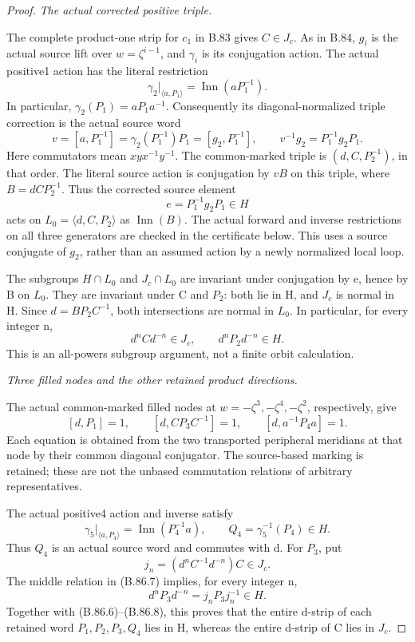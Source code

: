 \begin{proof}
\emph{The actual corrected positive triple.}\par
The complete product-one strip for \(c_1\) in B.83 gives \(C\in J_c\).
As in B.84, \(g_i\) is the actual source lift over
\(w=\zeta^{i-1}\), and \(\gamma_i\) is its conjugation action.
The actual positive1 action has the literal restriction
\[
 \gamma_2|_{\langle a,P_1\rangle}
                   =\operatorname{Inn}(aP_1^{-1}).
\tag{B.86.4}
\]
In particular, \(\gamma_2(P_1)=aP_1a^{-1}\). Consequently its
diagonal-normalized triple correction is the actual source word
\[
 v=[a,P_1^{-1}]
   =\gamma_2(P_1^{-1})P_1=[g_2,P_1^{-1}],
 \qquad v^{-1}g_2=P_1^{-1}g_2P_1 .
\tag{B.86.5}
\]
Here commutators mean \(xyx^{-1}y^{-1}\).
The common-marked triple is \((d,C,P_2^{-1})\), in that order.
The literal source action is conjugation by \(vB\) on this triple,
where \(B=dCP_2^{-1}\). Thus the corrected source element
\[
                  e=P_1^{-1}g_2P_1\in H
\]
acts on \(L_0=\langle d,C,P_2\rangle\) as \(\operatorname{Inn}(B)\).
The actual forward and inverse restrictions on all three generators
are checked in the certificate below. This uses a source conjugate of
\(g_2\), rather than an assumed action by a newly normalized local loop.

The subgroups \(H\cap L_0\) and \(J_c\cap L_0\) are invariant under
conjugation by e, hence by B on \(L_0\). They are invariant under C
and \(P_2\): both lie in H, and \(J_c\) is normal in H.
Since \(d=BP_2C^{-1}\), both intersections are normal in \(L_0\).
In particular, for every integer n,
\[
             d^nCd^{-n}\in J_c,\qquad
             d^nP_2d^{-n}\in H .
\tag{B.86.6}
\]
This is an all-powers subgroup argument, not a finite orbit calculation.

\emph{Three filled nodes and the other retained product directions.}\par
The actual common-marked filled nodes at
\(w=-\zeta^3,-\zeta^4,-\zeta^2\), respectively, give
\[
 [d,P_1]=1,\qquad [d,CP_3C^{-1}]=1,\qquad
                       [d,a^{-1}P_4a]=1 .
\tag{B.86.7}
\]
Each equation is obtained from the two transported peripheral
meridians at that node by their common diagonal conjugator.
The source-based marking is retained; these are not the unbased
commutation relations of arbitrary representatives.

The actual positive4 action and inverse satisfy
\[
 \gamma_5|_{\langle a,P_4\rangle}
       =\operatorname{Inn}(P_4^{-1}a),\qquad
              Q_4=\gamma_5^{-1}(P_4)\in H .
\tag{B.86.8}
\]
Thus \(Q_4\) is an actual source word and commutes with d.
For \(P_3\), put
\[
                  j_n=(d^nC^{-1}d^{-n})C\in J_c.
\]
The middle relation in (B.86.7) implies, for every integer n,
\[
                   d^nP_3d^{-n}=j_nP_3j_n^{-1}\in H .
\tag{B.86.9}
\]
Together with (B.86.6)--(B.86.8), this proves that the entire
d-strip of each retained word \(P_1,P_2,P_3,Q_4\) lies in H,
whereas the entire d-strip of C lies in \(J_c\).


\end{proof}
